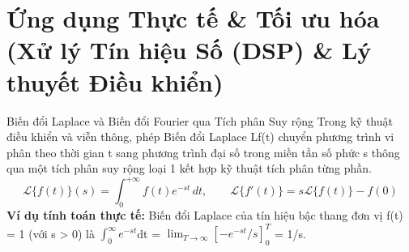 \documentclass[11pt,a4paper,oneside]{book}
\begin{document}
\section{Ứng dụng Thực tế \& Tối ưu hóa (Xử lý Tín hiệu Số (DSP) \& Lý thuyết Điều khiển)}
\begin{ungdung}{Biến đổi Laplace và Biến đổi Fourier qua Tích phân Suy rộng}
Trong kỹ thuật điều khiển và viễn thông, phép Biến đổi Laplace L{f(t)} chuyển phương trình vi phân theo thời gian t sang phương trình đại số trong miền tần số phức s thông qua một tích phân suy rộng loại 1 kết hợp kỹ thuật tích phân từng phần.
\[ \mathcal{L}\{f(t)\}(s) = \int_0^{+\infty} f(t) e^{-st}\,dt, \qquad \mathcal{L}\{f'(t)\} = s\mathcal{L}\{f(t)\} - f(0) \]
\noindent\textbf{Ví dụ tính toán thực tế:} Biến đổi Laplace của tín hiệu bậc thang đơn vị f(t) = 1 (với s > 0) là $\int_0^\infty e^{-st}$dt = $\lim_{T\to \infty} [-e^{-st}/s]_0^T$ = 1/s.
\end{ungdung}
\end{document}
